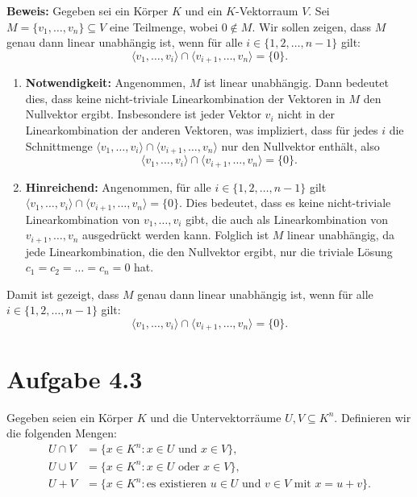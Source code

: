 \documentclass[11pt]{article}
\begin{document}
\textbf{Beweis:} Gegeben sei ein Körper \( K \) und ein \( K \)-Vektorraum \( V \). Sei \( M = \{v_1, \dots, v_n\} \subseteq V \) eine Teilmenge, wobei \( 0 \notin M \). Wir sollen zeigen, dass \( M \) genau dann linear unabhängig ist, wenn für alle \( i \in \{1, 2, \dots, n-1\} \) gilt:
\[
\langle v_1, \dots, v_i \rangle \cap \langle v_{i+1}, \dots, v_n \rangle = \{0\}.
\]

\begin{enumerate}
    \item \textbf{Notwendigkeit:} Angenommen, \( M \) ist linear unabhängig. Dann bedeutet dies, dass keine nicht-triviale Linearkombination der Vektoren in \( M \) den Nullvektor ergibt. Insbesondere ist jeder Vektor \( v_i \) nicht in der Linearkombination der anderen Vektoren, was impliziert, dass für jedes \( i \) die Schnittmenge \( \langle v_1, \dots, v_i \rangle \cap \langle v_{i+1}, \dots, v_n \rangle \) nur den Nullvektor enthält, also
    \[
    \langle v_1, \dots, v_i \rangle \cap \langle v_{i+1}, \dots, v_n \rangle = \{0\}.
    \]

    \item \textbf{Hinreichend:} Angenommen, für alle \( i \in \{1, 2, \dots, n-1\} \) gilt \( \langle v_1, \dots, v_i \rangle \cap \langle v_{i+1}, \dots, v_n \rangle = \{0\} \). Dies bedeutet, dass es keine nicht-triviale Linearkombination von \( v_1, \dots, v_i \) gibt, die auch als Linearkombination von \( v_{i+1}, \dots, v_n \) ausgedrückt werden kann. Folglich ist \( M \) linear unabhängig, da jede Linearkombination, die den Nullvektor ergibt, nur die triviale Lösung \( c_1 = c_2 = \dots = c_n = 0 \) hat.
\end{enumerate}

Damit ist gezeigt, dass \( M \) genau dann linear unabhängig ist, wenn für alle \( i \in \{1, 2, \dots, n-1\} \) gilt:
\[
\langle v_1, \dots, v_i \rangle \cap \langle v_{i+1}, \dots, v_n \rangle = \{0\}.
\]


\section*{Aufgabe 4.3}

Gegeben seien ein Körper \( K \) und die Untervektorräume \( U, V \subseteq K^n \). Definieren wir die folgenden Mengen:
\[
\begin{aligned}
    U \cap V &= \{ x \in K^n : x \in U \text{ und } x \in V \}, \\
    U \cup V &= \{ x \in K^n : x \in U \text{ oder } x \in V \}, \\
    U + V &= \{ x \in K^n : \text{es existieren } u \in U \text{ und } v \in V \text{ mit } x = u + v \}.
\end{aligned}
\]
\end{document}
